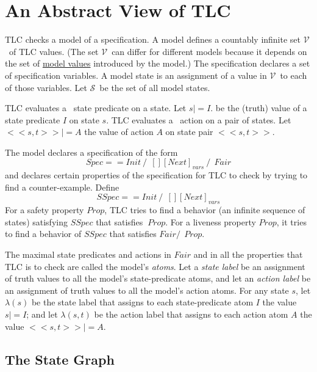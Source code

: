 \documentclass[fleqn,leqno]{article}
\newcommand{\states}{\ensuremath{\mathcal{S}}}
\newcommand{\values}{\ensuremath{\mathcal{V}}}
\begin{document}
\section{An Abstract View of TLC}

TLC checks a model of a specification.  A model defines a countably
infinite set \values\ of TLC values.  (The set \values\ can differ for
different models because it depends on the set of 
    \hyperref{http://tla.msr-inria.inria.fr/tlatoolbox/doc/model/model-values.html}{}{}{model values}
introduced by the model.)  The specification declares a set of
specification variables.  A model state is an assignment of a value in
\values\ to each of those variables.  Let \states\ be the set of all
model states.

TLC evaluates a \tlaplus\ state predicate on a state.  Let $s|=I$.  be
the (truth) value of a state predicate $I$ on state $s$.  TLC
evaluates a \tlaplus\ action on a pair of states.  Let $<<s,t>>|=A$
the value of action $A$ on state pair $<<s, t>>$.

The model declares a specification of the form
  \[ Spec == Init \ /\ \ [][Next]_{vars} \ /\ \ Fair
  \]
and declares certain properties of the specification for TLC to check
by trying to find a counter-example.  Define
  \[ SSpec == Init \ /\ \ [][Next]_{vars}\]
For a safety property $Prop$, TLC tries to find a behavior (an
infinite sequence of states) satisfying $SSpec$ that satisfies
$~Prop$.  For a liveness property $Prop$, it tries to find a behavior
of $SSpec$ that satisfies $Fair /\ ~Prop$.

The maximal state predicates and actions in $Fair$ and in all the
properties that TLC is to check are called the model's \emph{atoms}.
Let a \emph{state label} be an assignment of truth values to all the
model's state-predicate atoms, and let an \emph{action label} be an
assignment of truth values to all the model's action atoms.  For any
state $s$, let $\lambda(s)$ be the state label that assigns to each
state-predicate atom $I$ the value $s|=I$; and let $\lambda(s,t)$ be
the action label that assigns to each action atom $A$ the value
$<<s,t>>|=A$.

\subsection{The State Graph}
\end{document}
